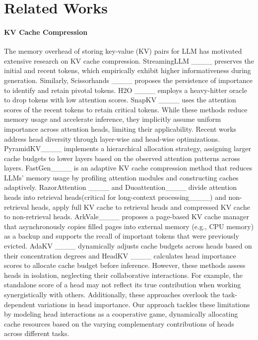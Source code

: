 \section{Related Works}

\paragraph{KV Cache Compression} The memory overhead of storing key-value (KV) pairs for LLM has motivated extensive research on KV cache compression. StreamingLLM ____ preserves the initial and recent tokens, which empirically exhibit higher informativeness during generation. Similarly, Scissorhands ____ proposes the persistence of importance to identify and retain pivotal tokens. H2O ____ employs a heavy-hitter oracle to drop tokens with low attention scores.  SnapKV ____ uses the attention scores of the recent tokens to retain critical tokens. While these methods reduce memory usage and accelerate inference, they implicitly assume uniform importance across attention heads, limiting their applicability.  Recent works address head diversity through layer-wise and head-wise optimizations. PyramidKV____ implements a hierarchical allocation strategy, assigning larger cache budgets to lower layers based on the observed attention patterns across layers. FastGen____ is an adaptive KV cache compression method that reduces LLMs' memory usage by profiling attention modules and constructing caches adaptively. RazorAttention ____ and Duoattention____ divide attention heads into retrieval heads(critical for long-context processing____) and non-retrieval heads, apply full KV cache to retrieval heads and compressed KV cache to non-retrieval heads. ArkVale____ proposes a page-based KV cache manager that asynchronously copies filled pages into external memory (e.g., CPU memory) as a backup and supports the recall of important tokens that were previously evicted. AdaKV ____ dynamically adjusts cache budgets across heads based on their concentration degrees and HeadKV ____ calculates head importance scores to allocate cache budget before inference.
However, these methods assess heads in isolation, neglecting their collaborative interactions. For example, the standalone score of a head may not reflect its true contribution when working synergistically with others. Additionally, these approaches overlook the task-dependent variations in head importance. 
Our approach tackles these limitations by modeling head interactions as a cooperative game, dynamically allocating cache resources based on the varying complementary contributions of heads across different tasks.

